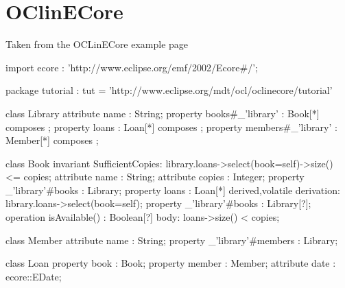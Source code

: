 \chapter{OClinECore}

Taken from the OCLinECore example page

\begin{oclinecore}
    import ecore : 'http://www.eclipse.org/emf/2002/Ecore#/';
    
    package tutorial : tut = 'http://www.eclipse.org/mdt/ocl/oclinecore/tutorial'
    {
        class Library
        {
            attribute name : String;
            property books#_'library' : Book[*] { composes };
            property loans : Loan[*] { composes };
            property members#_'library' : Member[*] { composes };
        }
        
        class Book
        {
            invariant SufficientCopies:
                library.loans->select(book=self)->size() <= copies;
            attribute name : String;
            attribute copies : Integer;
            property _'library'#books : Library;
            property loans : Loan[*] { derived,volatile }
            {
                derivation: library.loans->select(book=self);
            }
            property _'library'#books : Library[?];
            operation isAvailable() : Boolean[?]
            {
                body: loans->size() < copies;
            }
        }
        
        class Member
        {
            attribute name : String;
            property _'library'#members : Library;
        }
        
        class Loan
        {
            property book : Book;
            property member : Member;
            attribute date : ecore::EDate;
        }
    }
\end{oclinecore}